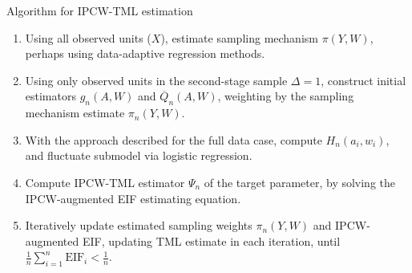 \documentclass{beamer}
\begin{document}
\begin{frame}[c]{Algorithm for IPCW-TML estimation}

\begin{center}
\begin{enumerate}\label{ipcwtmle_algo}
  \itemsep8pt
  \item Using all observed units ($X$), estimate sampling mechanism
    $\pi(Y, W)$, perhaps using data-adaptive regression methods.
  \item Using only observed units in the second-stage sample $\Delta = 1$,
    construct initial estimators $g_n(A,W)$ and $\overline{Q}_n(A,W)$,
    weighting by the sampling mechanism estimate $\pi_n(Y,W)$.
  \item With the approach described for the full data case, compute
    $H_n(a_i,w_i)$, and fluctuate submodel via logistic regression.
  \item Compute IPCW-TML estimator $\Psi_n$ of the target parameter, by solving
    the IPCW-augmented EIF estimating equation.
  \item Iteratively update estimated sampling weights $\pi_n(Y, W)$ and
    IPCW-augmented EIF, updating TML estimate in each iteration, until
    $\frac{1}{n}\sum_{i = 1}^n \text{EIF}_i < \frac{1}{n}$.
\end{enumerate}
\end{center}


\end{frame}

\end{document}
